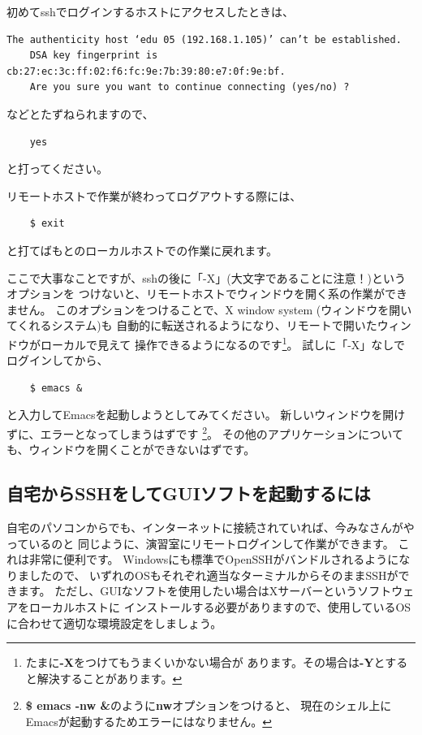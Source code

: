 \documentclass[a4j]{ltjreport}
\begin{document}
    初めてsshでログインするホストにアクセスしたときは、
    \begin{Verbatim}[baselinestretch=0.5]
    The authenticity host ‘edu 05 (192.168.1.105)’ can’t be established.
    DSA key fingerprint is cb:27:ec:3c:ff:02:f6:fc:9e:7b:39:80:e7:0f:9e:bf.
    Are you sure you want to continue connecting (yes/no) ?
    \end{Verbatim}
    などとたずねられますので、
    \begin{verbatim}
    yes 
    \end{verbatim}
    と打ってください。

    リモートホストで作業が終わってログアウトする際には、
    \begin{verbatim}
    $ exit
    \end{verbatim}
    と打てばもとのローカルホストでの作業に戻れます。

    ここで大事なことですが、sshの後に「-X」(大文字であることに注意！)というオプションを
    つけないと、リモートホストでウィンドウを開く系の作業ができません。
    このオプションをつけることで、X window system (ウィンドウを開いてくれるシステム)も
    自動的に転送されるようになり、リモートで開いたウィンドウがローカルで見えて
    操作できるようになるのです\footnote{たまに\textbf{-X}をつけてもうまくいかない場合が
    あります。その場合は\textbf{-Y}とすると解決することがあります。}。
    試しに「-X」なしでログインしてから、
    \begin{verbatim}
    $ emacs &
    \end{verbatim}
    と入力してEmacsを起動しようとしてみてください。
    新しいウィンドウを開けずに、エラーとなってしまうはずです
    \footnote{\textbf{\$ emacs -nw \&}のように\textbf{nw}オプションをつけると、
    現在のシェル上にEmacsが起動するためエラーにはなりません。}。
    その他のアプリケーションについても、ウィンドウを開くことができないはずです。

    \vspace{1em}

    \subsection{自宅からSSHをしてGUIソフトを起動するには}
    自宅のパソコンからでも、インターネットに接続されていれば、今みなさんがやっているのと
    同じように、演習室にリモートログインして作業ができます。
    これは非常に便利です。
    Windowsにも標準でOpenSSHがバンドルされるようになりましたので、
    いずれのOSもそれぞれ適当なターミナルからそのままSSHができます。
    ただし、GUIなソフトを使用したい場合はXサーバーというソフトウェアをローカルホストに
    インストールする必要がありますので、使用しているOSに合わせて適切な環境設定をしましょう。
\end{document}
